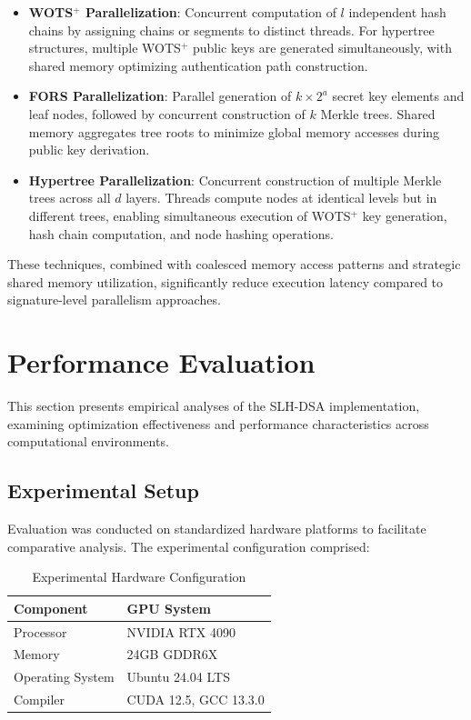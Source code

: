 \documentclass[journal]{IEEEtran}
\begin{document}
\begin{itemize}
  \item \textbf{WOTS$^+$ Parallelization}: Concurrent computation of $l$ independent hash chains by assigning chains or segments to distinct threads. For hypertree structures, multiple WOTS$^+$ public keys are generated simultaneously, with shared memory optimizing authentication path construction.

  \item \textbf{FORS Parallelization}: Parallel generation of $k \times 2^a$ secret key elements and leaf nodes, followed by concurrent construction of $k$ Merkle trees. Shared memory aggregates tree roots to minimize global memory accesses during public key derivation.

  \item \textbf{Hypertree Parallelization}: Concurrent construction of multiple Merkle trees across all $d$ layers. Threads compute nodes at identical levels but in different trees, enabling simultaneous execution of WOTS$^+$ key generation, hash chain computation, and node hashing operations.
\end{itemize}

These techniques, combined with coalesced memory access patterns and strategic shared memory utilization, significantly reduce execution latency compared to signature-level parallelism approaches.

\section{Performance Evaluation}\label{sec:evaluation}

This section presents empirical analyses of the SLH-DSA implementation, examining optimization effectiveness and performance characteristics across computational environments.

\subsection{Experimental Setup}

Evaluation was conducted on standardized hardware platforms to facilitate comparative analysis. The experimental configuration comprised:

\begin{table}[h]
  \centering
  \caption{Experimental Hardware Configuration}
  \label{tab:hardware_config}
  \begin{tabular}{@{}ll@{}}
    \toprule
    \textbf{Component} & \textbf{GPU System} \\
    \midrule
    Processor & NVIDIA RTX 4090 \\
    Memory & 24GB GDDR6X \\
    Operating System & Ubuntu 24.04 LTS \\
    Compiler & CUDA 12.5, GCC 13.3.0 \\
    \bottomrule
  \end{tabular}
\end{table}
\end{document}
